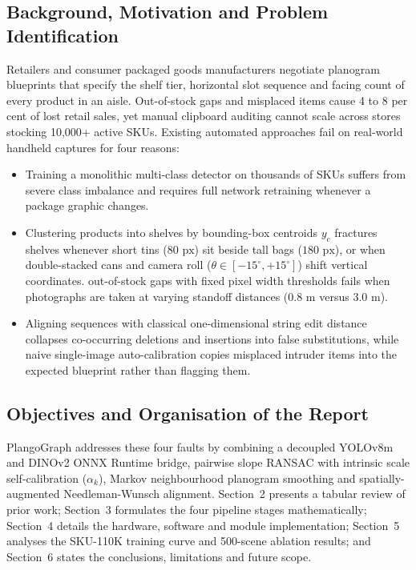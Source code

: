 \documentclass[10pt,a4paper]{article}
\begin{document}
\subsection{Background, Motivation and Problem Identification}
Retailers and consumer packaged goods manufacturers negotiate planogram blueprints that specify the shelf tier, horizontal slot sequence and facing count of every product in an aisle. Out-of-stock gaps and misplaced items cause 4 to 8 per cent of lost retail sales, yet manual clipboard auditing cannot scale across stores stocking 10,000+ active SKUs. Existing automated approaches fail on real-world handheld captures for four reasons:
\begin{itemize}\setlength{\itemsep}{2pt}\setlength{\parskip}{0pt}
    \item Training a monolithic multi-class detector on thousands of SKUs suffers from severe class imbalance and requires full network retraining whenever a package graphic changes.
    \item Clustering products into shelves by bounding-box centroids $y_c$ fractures shelves whenever short tins ($80\text{ px}$) sit beside tall bags ($180\text{ px}$), or when double-stacked cans and camera roll ($\theta \in [-15^\circ, +15^\circ]$) shift vertical coordinates.
    \itemEvaluating out-of-stock gaps with fixed pixel width thresholds fails when photographs are taken at varying standoff distances ($0.8\text{ m}$ versus $3.0\text{ m}$).
    \item Aligning sequences with classical one-dimensional string edit distance collapses co-occurring deletions and insertions into false substitutions, while naive single-image auto-calibration copies misplaced intruder items into the expected blueprint rather than flagging them.
\end{itemize}

\subsection{Objectives and Organisation of the Report}
PlangoGraph addresses these four faults by combining a decoupled YOLOv8m and DINOv2 ONNX Runtime bridge, pairwise slope RANSAC with intrinsic scale self-calibration ($\alpha_k$), Markov neighbourhood planogram smoothing and spatially-augmented Needleman-Wunsch alignment. Section~2 presents a tabular review of prior work; Section~3 formulates the four pipeline stages mathematically; Section~4 details the hardware, software and module implementation; Section~5 analyses the SKU-110K training curve and 500-scene ablation results; and Section~6 states the conclusions, limitations and future scope.
\end{document}
